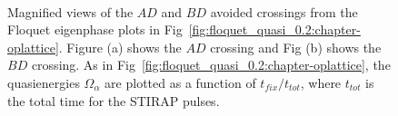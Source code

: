 \begin{figure} 
\ 
\caption{Magnified views of the $AD$ and $BD$ avoided crossings from the Floquet eigenphase plots in Fig~\ref{fig:floquet_quasi_0.2:chapter-oplattice}. Figure (a) shows the $AD$ crossing and Fig (b) shows the $BD$ crossing. As in Fig~\ref{fig:floquet_quasi_0.2:chapter-oplattice}, the quasienergies $\Omega_\alpha$ are plotted as a function of $t_{fix}/t_{tot}$, where $t_{tot}$ is the total time for the STIRAP pulses.}
\label{fig:floquet_states_0.2:mag:chapter-oplattice}
\end{figure}
